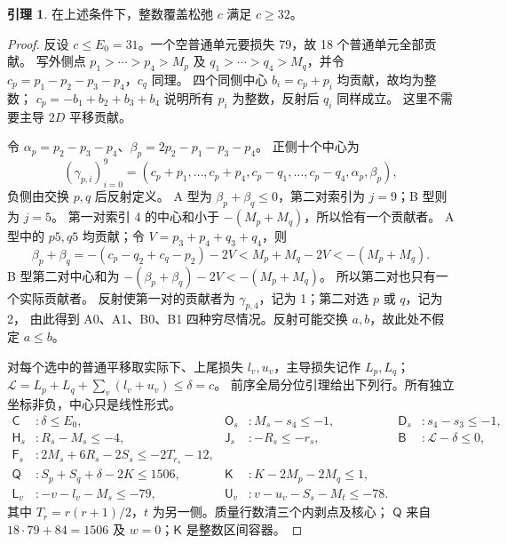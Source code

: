 \documentclass[11pt,a4paper]{article}
\theoremstyle{definition}
\newtheorem{lemma}[theorem]{引理}
\begin{document}
\begin{lemma}\label{c32}
在上述条件下，整数覆盖松弛 $c$ 满足 $c\ge32$。
\end{lemma}
\begin{proof}
反设 $c\le E_0=31$。一个空普通单元要损失 79，故 18 个普通单元全部贡献。
写外侧点 $p_1>\cdots>p_4>M_p$ 及 $q_1>\cdots>q_4>M_q$，并令
$c_p=p_1-p_2-p_3-p_4$，$c_q$ 同理。
四个同侧中心 $b_i=c_p+p_i$ 均贡献，故均为整数；
$c_p=-b_1+b_2+b_3+b_4$ 说明所有 $p_i$ 为整数，反射后 $q_i$ 同样成立。
这里不需要主导 $2D$ 平移贡献。

令 $\alpha_p=p_2-p_3-p_4$、$\beta_p=2p_2-p_1-p_3-p_4$。
正侧十个中心为
\[
 (\gamma_{p,i})_{i=0}^9=(c_p+p_1,\ldots,c_p+p_4,
 c_p-q_1,\ldots,c_p-q_4,\alpha_p,\beta_p),
\]
负侧由交换 $p,q$ 后反射定义。
A 型为 $\beta_p+\beta_q\le0$，第二对索引为 $j=9$；B 型则为 $j=5$。
第一对索引 4 的中心和小于 $-(M_p+M_q)$，所以恰有一个贡献者。
A 型中的 $p5,q5$ 均贡献；令 $V=p_3+p_4+q_3+q_4$，则
\[
 \beta_p+\beta_q=-(c_p-q_2+c_q-p_2)-2V
 <M_p+M_q-2V<-(M_p+M_q).
\]
B 型第二对中心和为 $-(\beta_p+\beta_q)-2V<-(M_p+M_q)$。
所以第二对也只有一个实际贡献者。
反射使第一对的贡献者为 $\gamma_{p,4}$，记为 1；第二对选 $p$ 或 $q$，记为 2，
由此得到 A0、A1、B0、B1 四种穷尽情况。反射可能交换 $a,b$，故此处不假定 $a\le b$。

对每个选中的普通平移取实际下、上尾损失 $l_v,u_v$，主导损失记作 $L_p,L_q$；
$\mathcal L=L_p+L_q+\sum_v(l_v+u_v)\le\delta=c$。
前序全局分位引理给出下列行。所有独立坐标非负，中心只是线性形式。
\begin{align*}
\mathsf C &: \delta\le E_0,&
\mathsf O_s &: M_s-s_4\le-1,&\mathsf D_s &:s_4-s_3\le-1,\\
\mathsf H_s &:R_s-M_s\le-4,&
\mathsf J_s &:-R_s\le-r_s,&\mathsf B &: \mathcal L-\delta\le0,\\
\mathsf F_s &:2M_s+6R_s-2S_s\le-2T_{r_s}-12,&&&\\
\mathsf Q &:S_p+S_q+\delta-2K\le1506,&
\mathsf K &:K-2M_p-2M_q\le1,&&\\
\mathsf L_v &:-v-l_v-M_s\le-79,&
\mathsf U_v &:v-u_v-S_s-M_t\le-78.&&
\end{align*}
其中 $T_r=r(r+1)/2$，$t$ 为另一侧。质量行数清三个内剥点及核心；
$\mathsf Q$ 来自 $18\cdot79+84=1506$ 及 $w=0$；$\mathsf K$ 是整数区间容器。


\end{proof}
\end{document}
